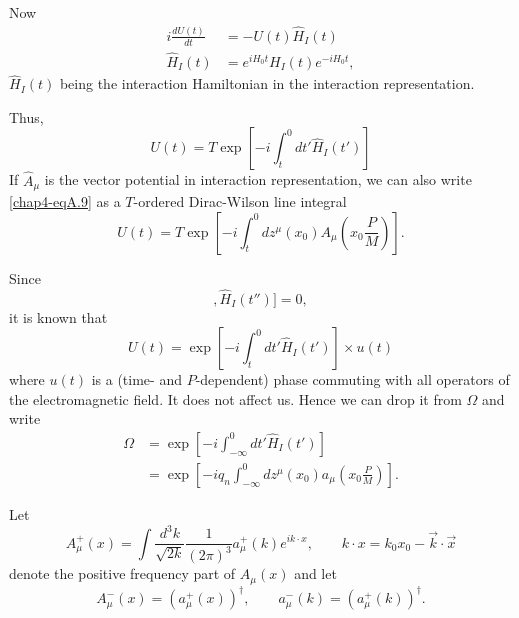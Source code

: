 Now
\begin{align*}
  i \frac{dU(t)}{dt} & = -U (t) \hat{H}_I(t)\\
  \hat{H}_I (t) & = e^{iH_0t} H_I (t) e^{-iH_0t}, \label{chap4-eqA.8}\tag{A.8}
\end{align*}
$\hat{H}_I(t)$ being the interaction Hamiltonian in the interaction representation.

Thus,
\begin{equation*}
U(t)= T\exp \left[-i \int^0_t dt' \hat{H}_I (t') \right]\label{chap4-eqA.9}\tag{A.9}
\end{equation*}
If $\hat{A}_\mu$ is the vector potential in interaction representation, we can also write \eqref{chap4-eqA.9} as a $T$-ordered Dirac-Wilson line integral
\begin{equation*}
U(t) = T \exp \left[-i \int^0_t dz^\mu (x_0) A_\mu  \left( x_0 \frac{P}{M}\right)\right]. \label{chap4-eqA.10}\tag{A.10}
\end{equation*}

Since
\begin{equation*}
  [[\hat{H}_I (t), \hat{H}_I(t')], \hat{H}_I (t'')]=0, \label{chap4-eqA.11}\tag{A.11}
\end{equation*}
it is known that \cite{chap4-key14}
\begin{equation*}
U(t) = \exp \left[ -i \int^0_t dt' \hat{H}_I (t')\right] \times u(t) \label{chap4-eqA.12}\tag{A.12}
\end{equation*}
where $u(t)$ is a (time- and $P$-dependent) phase commuting with all operators of the electromagnetic field. It does not affect us. Hence we can drop it from $\Omega$ and write
\eject
\begin{align*}
  \Omega & = \exp \left[-i \int^0_{-\infty} dt' \hat{H}_I (t') \right] \label{chap4-eqA.13}\tag{A.13}\\
  & = \exp \left[ -iq_n \int^0_{-\infty} dz^\mu (x_0) a_\mu \left( x_0 \frac{P}{M}\right)\right]. \label{chap4-eqA.14}\tag{A.14}
\end{align*}

Let
\begin{equation*}
  A_\mu^+ (x) = \int \frac{d^3k}{\sqrt{2k}} \frac{1}{(2\pi)^3}a_\mu^+ (k)e^{ik\cdot x}, \qquad k \cdot x = k_0 x_0- \vec{k} \cdot \vec{x} \label{chap4-eqA.15}\tag{A.15}
\end{equation*}
denote the positive frequency part of $A_\mu(x)$ and let
\begin{equation*}
A_\mu^- (x) = (a_\mu^+ (x))^\dagger, \qquad a_\mu^- (k) = (a_\mu^+ (k))^\dagger. \label{chap4-eqA.16}\tag{A.16}
\end{equation*}


